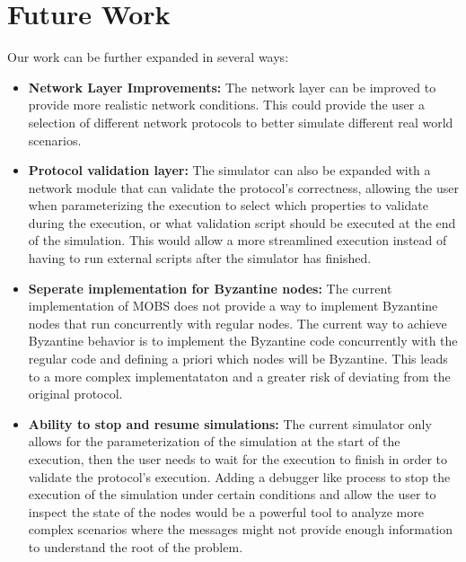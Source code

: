 \section{Future Work}\label{sub:future_work}

Our work can be further expanded in several ways:

\begin{itemize}
    \item \textbf{Network Layer Improvements:} The network layer can be improved to
    provide more realistic network conditions. This could provide the user a selection
    of different network protocols to better simulate different real world scenarios.

    \item \textbf{Protocol validation layer:} The simulator can also be expanded with a network
    module that can validate the protocol's correctness, allowing the user when parameterizing
    the execution to select which properties to validate during the execution, or what validation
    script should be executed at the end of the simulation. This would allow a more streamlined
    execution instead of having to run external scripts after the simulator has finished.

    \item \textbf{Seperate implementation for Byzantine nodes:} The current implementation
    of MOBS does not provide a way to implement Byzantine nodes that run concurrently with
    regular nodes. The current way to achieve Byzantine behavior is to implement the Byzantine
    code concurrently with the regular code and defining a priori which nodes will be Byzantine.
    This leads to a more complex implementataton and a greater risk of deviating from the
    original protocol.

    \item \textbf{Ability to stop and resume simulations:} The current simulator only allows
    for the parameterization of the simulation at the start of the execution, then the user needs
    to wait for the execution to finish in order to validate the protocol's execution. Adding a
    debugger like process to stop the execution of the simulation under certain conditions and allow
    the user to inspect the state of the nodes would be a powerful tool to analyze more complex scenarios
    where the messages might not provide enough information to understand the root of the problem.
\end{itemize}

